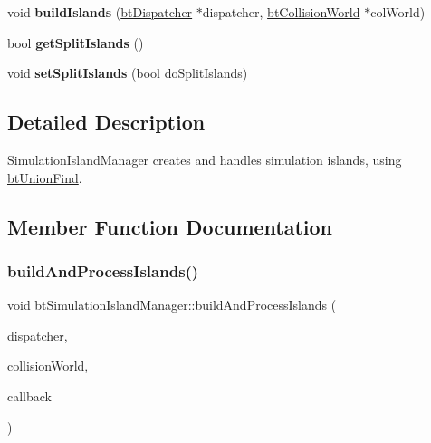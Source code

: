 \begin{DoxyCompactItemize}
\item 
\mbox{\label{classbtSimulationIslandManager_aea0b5869eca2d034ac9c643e149a5e01}} 
void {\bfseries build\+Islands} (\hyperlink{classbtDispatcher}{bt\+Dispatcher} $\ast$dispatcher, \hyperlink{classbtCollisionWorld}{bt\+Collision\+World} $\ast$col\+World)
\item 
\mbox{\label{classbtSimulationIslandManager_ae18b05fce2ab10d425ba0ec0aff0336e}} 
bool {\bfseries get\+Split\+Islands} ()
\item 
\mbox{\label{classbtSimulationIslandManager_a7bbea7ce9ec4c185d0110dd8dff99dd3}} 
void {\bfseries set\+Split\+Islands} (bool do\+Split\+Islands)
\end{DoxyCompactItemize}


\subsection{Detailed Description}
Simulation\+Island\+Manager creates and handles simulation islands, using \hyperlink{classbtUnionFind}{bt\+Union\+Find}. 

\subsection{Member Function Documentation}
\mbox{\label{classbtSimulationIslandManager_ab0f52dc46bc01c6754f4cb32ba26c99a}} 
\subsubsection{\texorpdfstring{build\+And\+Process\+Islands()}{buildAndProcessIslands()}}
{\footnotesize\ttfamily void bt\+Simulation\+Island\+Manager\+::build\+And\+Process\+Islands (\begin{DoxyParamCaption}\item[{\hyperlink{classbtDispatcher}{bt\+Dispatcher} $\ast$}]{dispatcher,  }\item[{\hyperlink{classbtCollisionWorld}{bt\+Collision\+World} $\ast$}]{collision\+World,  }\item[{\hyperlink{structbtSimulationIslandManager_1_1IslandCallback}{Island\+Callback} $\ast$}]{callback }\end{DoxyParamCaption})}

